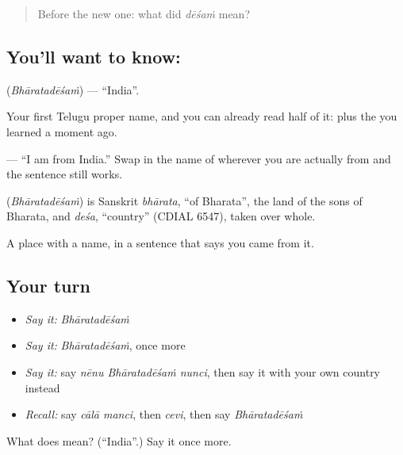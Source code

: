\label{lesson:TE-C77-india}



\begin{quote}
Before the new one: what did \emph{dēśaṁ} mean?
\end{quote}

\subsection*{You'll want to know: }
\textbf{} (\emph{Bhāratadēśaṁ}) — \textquotedblleft{}India\textquotedblright{}.

Your first Telugu proper name, and you can already read half of it: \textbf{} plus the  you learned a moment ago.

\textbf{  } — \textquotedblleft{}I am from India.\textquotedblright{} Swap in the name of wherever you are actually from and the sentence still works.

\begin{cousinweb}
\textbf{} (\emph{Bhāratadēśaṁ}) is Sanskrit \emph{bhārata}, \textquotedblleft{}of Bharata\textquotedblright{}, the land of the sons of Bharata, and \emph{deśa}, \textquotedblleft{}country\textquotedblright{} (CDIAL 6547), taken over whole.
\end{cousinweb}

\begin{grammarlens}[title={What you've built}]
A place with a name, in a sentence that says you came from it.
\end{grammarlens}

\subsection*{Your turn}
\begin{itemize}
\raggedright
  \item \emph{Say it:} \emph{Bhāratadēśaṁ}
  \item \emph{Say it:} \emph{Bhāratadēśaṁ}, once more
  \item \emph{Say it:} say \emph{nēnu Bhāratadēśaṁ nunci}, then say it with your own country instead
  \item \emph{Recall:} say \emph{cālā manci}, then \emph{cevi}, then say \emph{Bhāratadēśaṁ}
\end{itemize}

\begin{tcolorbox}[breakable,colback=teal!4,colframe=teal!35!black,title={Before you move on}]
What does  mean? (\textquotedblleft{}India\textquotedblright{}.) Say it once more.
\end{tcolorbox}
